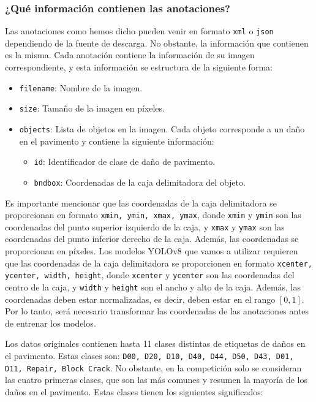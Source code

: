 \subsubsection{¿Qué información contienen las anotaciones?}
Las anotaciones como hemos dicho pueden venir en formato \texttt{xml} o \texttt{json} dependiendo de la fuente de descarga. No obstante, la información que contienen es la misma. Cada anotación contiene la información de su imagen correspondiente, y esta información se estructura de la siguiente forma:
\begin{itemize}
    \item \texttt{filename}: Nombre de la imagen.
    \item \texttt{size}: Tamaño de la imagen en píxeles.
    \item \texttt{objects}: Lista de objetos en la imagen. Cada objeto corresponde a un daño en el pavimento y contiene la siguiente información:
    \begin{itemize}
        \item \texttt{id}: Identificador de clase de daño de pavimento.
        \item \texttt{bndbox}: Coordenadas de la caja delimitadora del objeto.
    \end{itemize}
\end{itemize}
Es importante mencionar que las coordenadas de la caja delimitadora se proporcionan en formato \texttt{xmin, ymin, xmax, ymax}, donde \texttt{xmin} y \texttt{ymin} son las coordenadas del punto superior izquierdo de la caja, y \texttt{xmax} y \texttt{ymax} son las coordenadas del punto inferior derecho de la caja. Además, las coordenadas se proporcionan en píxeles. Los modelos YOLOv8 que vamos a utilizar requieren que las coordenadas de la caja delimitadora se proporcionen en formato \texttt{xcenter, ycenter, width, height}, donde \texttt{xcenter} y \texttt{ycenter} son las coordenadas del centro de la caja, y \texttt{width} y \texttt{height} son el ancho y alto de la caja. Además, las coordenadas deben estar normalizadas, es decir, deben estar en el rango $[0, 1]$. Por lo tanto, será necesario transformar las coordenadas de las anotaciones antes de entrenar los modelos.

Los datos originales contienen hasta 11 clases distintas de etiquetas de daños en el pavimento. Estas clases son: \texttt{D00, D20, D10, D40, D44, D50, D43, D01, D11, Repair, Block Crack}. No obstante, en la competición solo se consideran las cuatro primeras clases, que son las más comunes y resumen la mayoría de los daños en el pavimento. Estas clases tienen los siguientes significados:

